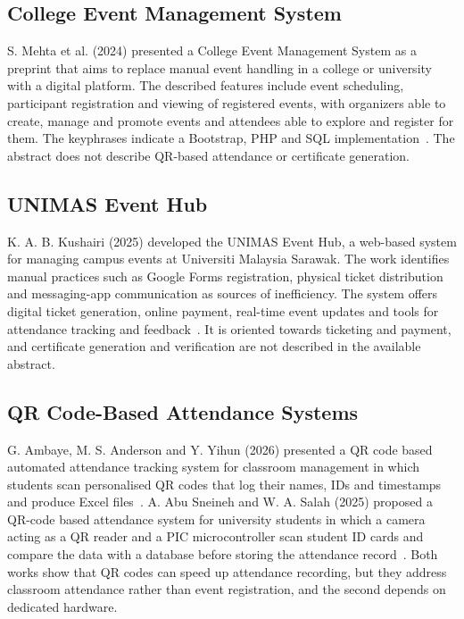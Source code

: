 \documentclass[12pt,a4paper]{report}
\begin{document}
\subsection{College Event Management System}
S. Mehta et al. (2024) presented a College Event Management System as a preprint that aims to replace manual event handling in a college or university with a digital platform. The described features include event scheduling, participant registration and viewing of registered events, with organizers able to create, manage and promote events and attendees able to explore and register for them. The keyphrases indicate a Bootstrap, PHP and SQL implementation~\cite{mehta}. The abstract does not describe QR-based attendance or certificate generation.

\subsection{UNIMAS Event Hub}
K. A. B. Kushairi (2025) developed the UNIMAS Event Hub, a web-based system for managing campus events at Universiti Malaysia Sarawak. The work identifies manual practices such as Google Forms registration, physical ticket distribution and messaging-app communication as sources of inefficiency. The system offers digital ticket generation, online payment, real-time event updates and tools for attendance tracking and feedback~\cite{kushairi}. It is oriented towards ticketing and payment, and certificate generation and verification are not described in the available abstract.

\subsection{QR Code-Based Attendance Systems}
G. Ambaye, M. S. Anderson and Y. Yihun (2026) presented a QR code based automated attendance tracking system for classroom management in which students scan personalised QR codes that log their names, IDs and timestamps and produce Excel files~\cite{ambaye}. A. Abu Sneineh and W. A. Salah (2025) proposed a QR-code based attendance system for university students in which a camera acting as a QR reader and a PIC microcontroller scan student ID cards and compare the data with a database before storing the attendance record~\cite{sneineh}. Both works show that QR codes can speed up attendance recording, but they address classroom attendance rather than event registration, and the second depends on dedicated hardware.
\end{document}
